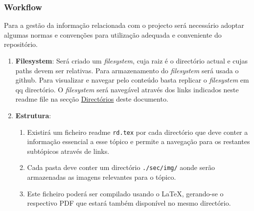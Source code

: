 \documentclass[11pt]{article}
\begin{document}
\subsubsection{Workflow}
\label{sec:org9de74ce}
Para a gestão da informação relacionada com o projecto será necessário adoptar
algumas normas e convenções para utilização adequada e conveniente do repositório.
\begin{enumerate}
\item \textbf{Filesystem}: Será criado um \emph{filesystem}, cuja raiz é o directório actual e
cujas paths devem ser relativas. Para armazenamento do \emph{filesystem} será
usada o github. Para visualizar e navegar pelo conteúdo basta replicar o
\emph{filesystem} em qq directório. O \emph{filesystem} será navegável através dos
links indicados neste readme file na secção \hyperref[sec:org675f262]{Directórios} deste documento.
\item \textbf{Estrutura}:
\begin{enumerate}
\item Existirá um ficheiro readme \texttt{rd.tex} por cada directório que deve conter a
informação essencial a esse tópico e permite a navegação para os restantes
subtópicos através de links.
\item Cada pasta deve conter um directório \texttt{./sec/img/} aonde serão armazenadas
as imagens relevantes para o tópico.
\item Este ficheiro poderá ser compilado usando o \LaTeX{}, gerando-se o respectivo
PDF que estará também disponível no mesmo directório.
\end{enumerate}
\end{enumerate}
\end{document}
